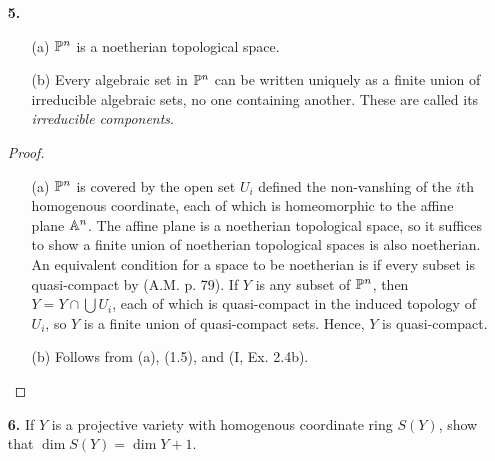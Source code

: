 \documentclass{article}
\begin{document}
\begin{enumerate} [label=\textbf{\arabic*.}, leftmargin=0cm]
\begin{proof}
\begin{itemize} [leftmargin=0cm]
        Conversely, let $\goth{p}$ be a homogenous prime ideal, and suppose that $Z(\goth{p}) = Y_1 \cup Y_2$. Then $\goth{p} = I(Y_1) \cap I(Y_2)$, so either $\goth{p} = I(Y_1)$ or $\goth{p} = I(Y_2)$. Thus, $Z(\goth{p}) = Y_1$ or $Y_2$, hence it is irreducible.

        \item[(c)] $I(\PP^n) = (0)$, which is a prime ideal.
    \end{itemize}
\end{proof}

\item[\textbf{5.}] \begin{itemize}
    \item[(a)] $\mathbb{P}^n$ is a noetherian topological space.
    \item[(b)] Every algebraic set in $\mathbb{P}^n$ can be written uniquely as a finite union of irreducible algebraic sets, no one containing another. These are called its \textit{irreducible components}.
\end{itemize}

\begin{proof} $ $ \vspace{0pt}
    \begin{itemize} [leftmargin=0cm]
        \item[(a)] $\mathbb{P}^n$ is covered by the open set $U_i$ defined the non-vanshing of the $i$th homogenous coordinate, each of which is homeomorphic to the affine plane $\mathbb{A}^n$.
        The affine plane is a noetherian topological space, so it suffices to show a finite union of noetherian topological spaces is also noetherian.
        An equivalent condition for a space to be noetherian is if every subset is quasi-compact by (A.M. p. 79). If $Y$ is any subset of $\mathbb{P}^n$, then $Y = Y \cap \bigcup U_i$, each of which is quasi-compact in the induced topology of $U_i$, so $Y$ is a finite union of quasi-compact sets. Hence, $Y$ is quasi-compact.

        \item[(b)] Follows from (a), (1.5), and (I, Ex. 2.4b).
    \end{itemize}
\end{proof}

\item[\textbf{6.}] If $Y$ is a projective variety with homogenous coordinate ring $S(Y)$, show that $\dim{S(Y)} = \dim{Y} + 1$.


\end{enumerate}
\end{document}
